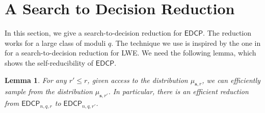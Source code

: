 \documentclass[11pt]{article}
\theoremstyle{plain}
\newtheorem{lemma}[theorem]{Lemma}
\theoremstyle{definition}
\def\edcp{\mathsf{EDCP}}
\begin{document}



\section{A Search to Decision Reduction}

In this section, we give a search-to-decision reduction for $\edcp$. The reduction works for a large class of moduli $q$. The technique we use is inspired by the one in \cite{micciancio2012trapdoors} for a search-to-decision reduction for LWE. We need the following lemma, which shows the self-reducibility of $\edcp$.
\begin{lemma}
    \label{lem:self-rd}
    For any $r' \le r$, given access to the distribution $\mu_{\bm{s}, r}$, we can efficiently sample from the distribution $\mu_{\bm{s}, r'}$. In particular, there is an efficient reduction from $\edcp_{n, q, r}$ to $\edcp_{n, q, r'}$.
\end{lemma}
\end{document}
